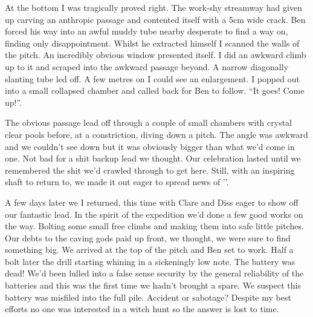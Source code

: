 At the bottom I was tragically proved right. The work-shy streamway had given up carving an anthropic passage and contented itself with a 5cm wide crack. Ben forced his way into an awful muddy tube nearby desperate to find a way on, finding only disappointment. Whilst he extracted himself I scanned the walls of the pitch. An incredibly obvious window presented itself. I did an awkward climb up to it and scraped into the awkward passage beyond. A narrow diagonally slanting tube led off. A few metres on I could see an enlargement. I popped out into a small collapsed chamber and called back for Ben to follow. “It goes! Come up!”. 

The obvious passage lead off through a couple of small chambers with crystal clear pools before, at a constriction, diving down a pitch. The angle was awkward and we couldn’t see down but it was obviously bigger than what we’d come in one. Not bad for a shit backup lead we thought. Our celebration lasted until we remembered the shit we’d crawled through to get here. Still, with an inspiring shaft to return to, we made it out eager to spread news of ''.
 \begin{marginfigure}
\end{marginfigure}
A few days later we I returned, this time with Clare and Diss eager to show off our fantastic lead. In the spirit of the expedition we’d done a few good works on the way. Bolting some small free climbs and making them into safe little pitches. Our debts to the caving gods paid up front, we thought, we were sure to find something big. We arrived at the top of the pitch and Ben set to work. Half a bolt later the drill starting whining in a sickeningly low note. The battery was dead! We’d been lulled into a false sense security by the general reliability of the batteries and this was the first time we hadn’t brought a spare. We suspect this battery was misfiled into the full pile. Accident or sabotage? Despite my best efforts no one was interested in a witch hunt so the answer is lost to time.

